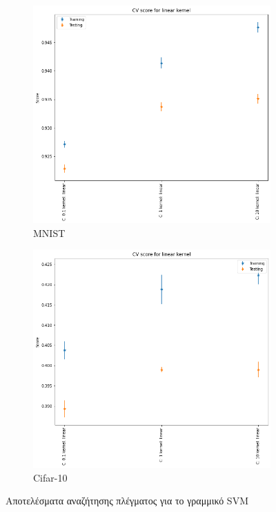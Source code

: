 \documentclass[a4paper]{article}
\begin{document}
\begin{figure}[H]
    \centering

    \begin{subfigure}[t]{0.45\linewidth}
    \includegraphics[width=\linewidth]{figures/mnist/cv_results_linear.png}
    \caption{MNIST}
    \end{subfigure}
    \begin{subfigure}[t]{0.45\linewidth}
    \includegraphics[width=\linewidth]{figures/cifar/cv_results_linear.png}
    \caption{Cifar-10}
    \end{subfigure}

    \caption{Αποτελέσματα αναζήτησης πλέγματος για το γραμμικό SVM}
    \label{fig:cv_linear}
\end{figure}
\end{document}
